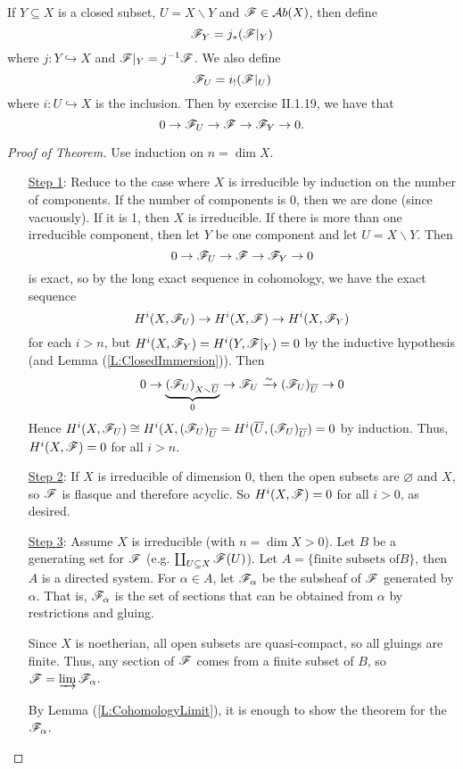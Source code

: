 If $Y\subseteq X$ is a closed subset, $U=X\smallsetminus Y$ and
$\mathscr{F}\in \mathcal{A}b(X)$, then define
\[\mathscr{F}_Y = j_*(\mathscr{F}|_Y)\]
where $j:Y\hookrightarrow X$ and $\mathscr{F}|_Y = j^{-1}\mathscr{F}$.  We also
define
\[ \mathscr{F}_U = i_!(\mathscr{F}|_U)\]
where $i:U\hookrightarrow X$ is the inclusion.  Then by exercise
II.1.19, we have that
\[
    0 \to \mathscr{F}_U \to \mathscr{F} \to \mathscr{F}_Y \to 0.
\]

\begin{proof}[Proof of Theorem]\def\R{\mathscr{R}}  Use induction on $n=\dim X$.
\begin{itemize}
\item[\underline{Step 1}:] Reduce to the case where $X$ is
irreducible by induction on the number of components.  If the
number of components is 0, then we are done (since vacuously).  If
it is 1, then $X$ is irreducible.  If there is more than one
irreducible component, then let $Y$ be one component and let
$U=X\smallsetminus Y$.  Then
\[
     0 \to \mathscr{F}_U \to \mathscr{F} \to \mathscr{F}_Y \to 0
\]
is exact, so by the long exact sequence in cohomology, we have the
exact sequence
\[
    H^i(X,\mathscr{F}_U)\to H^i(X,\mathscr{F}) \to H^i(X,\mathscr{F}_Y)
\]
for each $i>n$, but $H^i(X,\mathscr{F}_Y) = H^i(Y,\mathscr{F}|_Y)=0$ by the
inductive hypothesis (and Lemma (\ref{L:ClosedImmersion})).  Then
\[
    0\to \underbrace{(\mathscr{F}_U)_{X\smallsetminus \overline{U}}}_0 \to
    \mathscr{F}_U\xrightarrow{\sim} (\mathscr{F}_U)_{\overline{U}}\to 0
\]
Hence $H^i(X,\mathscr{F}_U)\cong H^i(X,(\mathscr{F}_U)_{\overline{U}} =
H^i(\overline{U},(\mathscr{F}_U)_{\overline{U}}) = 0$ by induction.  Thus,
$H^i(X,\mathscr{F})=0$ for all $i>n$.

\item[\underline{Step 2}:] If $X$ is irreducible of dimension 0,
then the open subsets are $\varnothing$ and $X$, so $\mathscr{F}$ is
flasque and therefore acyclic.  So $H^i(X,\mathscr{F})=0$ for all $i>0$, as
desired.

\item[\underline{Step 3}:] Assume $X$ is irreducible (with $n=\dim
X>0$).  Let $B$ be a generating set for $\mathscr{F}$ (e.g.
$\coprod_{U\subseteq X} \mathscr{F}(U)$).  Let $A=\{\text{finite subsets of
} B\}$, then $A$ is a directed system.  For $\alpha\in A$, let
$\mathscr{F}_{\alpha}$ be the subsheaf of $\mathscr{F}$ generated by $\alpha$. That
is, $\mathscr{F}_{\alpha}$ is the set of sections that can be obtained from
$\alpha$ by restrictions and gluing.

Since $X$ is noetherian, all open subsets are quasi-compact, so
all gluings are finite. Thus, any section of $\mathscr{F}$ comes from a
finite subset of $B$, so $\mathscr{F}=\varinjlim \mathscr{F}_{\alpha}$.

By Lemma (\ref{L:CohomologyLimit}), it is enough to show the
theorem for the $\mathscr{F}_{\alpha}$.


\end{itemize}
\end{proof}
